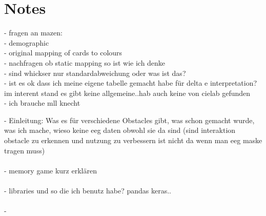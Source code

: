 \chapter{Notes}

- fragen an mazen:\\
- demographic\\
- original mapping of cards to colours\\
- nachfragen ob static mapping so ist wie ich denke\\
- sind whickser nur standardabweichung oder was ist das?\\
- ist es ok dass ich meine eigene tabelle gemacht habe für delta e interpretation? im interent stand es gibt keine allgemeine..hab auch keine von cielab gefunden\\
- ich brauche mll knecht

\newpage

- Einleitung: Was es für verschiedene Obstacles gibt, was schon gemacht wurde, was ich mache, wieso keine eeg daten obwohl sie da sind (sind interaktion obstacle zu erkennen und nutzung zu verbessern ist nicht da wenn man eeg maske tragen muss)\\\\
- memory game kurz erklären\\\\
- libraries und so die ich benutz habe? pandas keras..\\\\

- 

